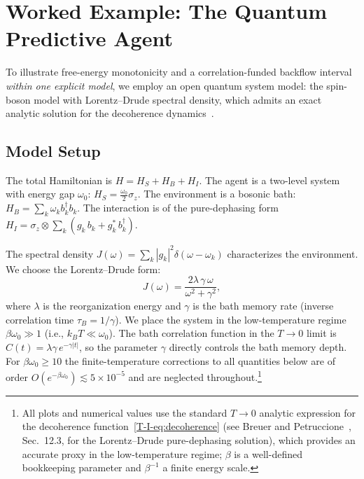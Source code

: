 \documentclass[12pt,a4paper,openany]{book}
\begin{document}
\section{Worked Example: The Quantum Predictive Agent}
\label{T-I-sec:example}

To illustrate free-energy monotonicity and a correlation-funded
backflow interval \emph{within one explicit model}, we employ an open quantum
system model: the spin-boson model with Lorentz--Drude spectral
density, which admits an exact analytic solution for the
decoherence dynamics~\cite{BreuerPetruccione2002}.

\subsection{Model Setup}

The total Hamiltonian is $H = H_S + H_B + H_I$.
The agent is a two-level system with energy gap $\omega_0$:
$H_S = \tfrac{\omega_0}{2}\sigma_z$.
The environment is a bosonic bath:
$H_B = \sum_k \omega_k b_k^\dagger b_k$.
The interaction is of the pure-dephasing form
$H_I = \sigma_z \otimes \sum_k (g_k\, b_k
+ g_k^*\, b_k^\dagger)$.

The spectral density
$J(\omega) = \sum_k |g_k|^2 \delta(\omega - \omega_k)$
characterizes the environment. We choose the Lorentz--Drude form:
\begin{equation}
\label{T-I-eq:lorentz_drude}
J(\omega) = \frac{2\lambda\, \gamma\, \omega}
  {\omega^2 + \gamma^2},
\end{equation}
where $\lambda$ is the reorganization energy and $\gamma$ is the
bath memory rate (inverse correlation time
$\tau_B = 1/\gamma$).
We place the system in the low-temperature regime
$\beta\omega_0 \gg 1$ (i.e., $k_BT \ll \omega_0$).
The bath correlation function in the $T \to 0$ limit is
$C(t) = \lambda\gamma\, e^{-\gamma|t|}$, so the parameter
$\gamma$ directly controls the bath memory depth.
For $\beta\omega_0 \geq 10$ the finite-temperature corrections
to all quantities below are of order
$O(e^{-\beta\omega_0}) \lesssim 5 \times 10^{-5}$ and
are neglected throughout.\footnote{All plots and numerical values
use the standard $T \to 0$ analytic expression for the
decoherence function~\eqref{T-I-eq:decoherence}
(see Breuer and Petruccione~\cite{BreuerPetruccione2002},
Sec.~12.3, for the Lorentz--Drude pure-dephasing solution),
which provides an accurate proxy in the low-temperature
regime;
$\beta$ is a well-defined bookkeeping parameter and
$\beta^{-1}$ a finite energy scale.}
\end{document}
